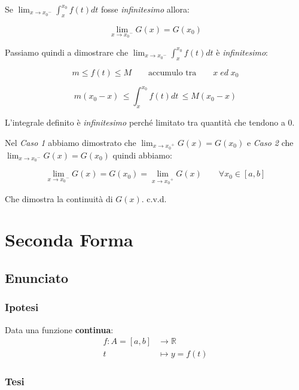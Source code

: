 \documentclass[../dimostrazioni]{subfiles}
\begin{document}
                    Se \( \lim_{x \to {x_0}^{-}} \int_{x}^{x_0} f(t) dt \) fosse \emph{infinitesimo} allora:

                    \[  \lim_{x \to {x_0}^{-}}G(x) = G(x_0) \]

                    Passiamo quindi a dimostrare che \( \lim_{x \to {x_0}^{-}} \int_{x}^{x_0} f(t) dt \) è \emph{infinitesimo}:

                    \[m \leqslant f(t) \leqslant M \qquad \text {accumulo tra} \qquad x \; ed \; x_0 \]

                    \[m(x_0-x) \, \leqslant \int_{x}^{x_0} f(t) dt \, \leqslant M(x_0-x) \]

                    L'integrale definito è \emph{infinitesimo} perché limitato tra quantità che tendono a 0.

                Nel \textit{Caso 1} abbiamo dimostrato che \(  \lim_{x \to {x_0}^{+}}G(x) = G(x_0) \) e \textit{Caso 2} che \(  \lim_{x \to {x_0}^{-}}G(x) = G(x_0) \) quindi abbiamo:

                \[  \lim_{x \to {x_0}^{-}}G(x) = G(x_0) = \lim_{x \to {x_0}^{+}}G(x) \qquad \forall x_0 \in [a, b] \]

                Che dimostra la continuità di \(G(x)\). c.v.d.
            
            \section*{Seconda Forma}

                \subsection*{Enunciato}

                    \subsubsection*{Ipotesi}

                        Data una funzione \textbf{continua}:
                        \begin{align*}
                            f : A = [a, b] &\longrightarrow \mathbb{R}\\
                            t &\longmapsto y = f(t) 
                        \end{align*}

                    \subsubsection*{Tesi}
                    
\end{document}
